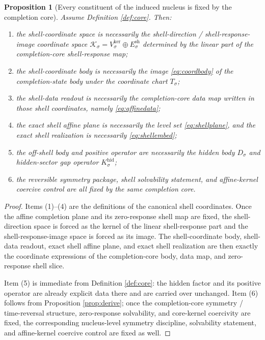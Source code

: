 \documentclass[11pt]{article}
\newcommand{\GapBody}[1]{D_{#1}}
\newcommand{\HiddenOperator}[1]{K_{#1}^{\mathrm{hid}}}
\newcommand{\CoordSpace}[1]{\mathcal K_{#1}}
\newcommand{\ShellNormal}[1]{E_{#1}^{\mathrm{sh}}}
\newcommand{\ShellKer}[1]{V_{#1}^{\mathrm{ker}}}
\newcommand{\CoordIso}[1]{T_{#1}}
\newtheorem{proposition}{Proposition}
\begin{document}
\begin{proposition}[Every constituent of the induced nucleus is fixed by the completion core]
\label{prop:forced}
Assume Definition \ref{def:core}. Then:
\begin{enumerate}
    \item the shell-coordinate space is necessarily the shell-direction / shell-response-image coordinate space \(\CoordSpace{\sigma}=\ShellKer{\sigma}\oplus\ShellNormal{\sigma}\) determined by the linear part of the completion-core shell-response map;
    \item the shell-coordinate body is necessarily the image \eqref{eq:coordbody} of the completion-state body under the coordinate chart \(\CoordIso{\sigma}\);
    \item the shell-data readout is necessarily the completion-core data map written in those shell coordinates, namely \eqref{eq:affinedata};
    \item the exact shell affine plane is necessarily the level set \eqref{eq:shellplane}, and the exact shell realization is necessarily \eqref{eq:shellembed};
    \item the off-shell body and positive operator are necessarily the hidden body \(\GapBody{\sigma}\) and hidden-sector gap operator \(\HiddenOperator{\sigma}\);
    \item the reversible symmetry package, shell solvability statement, and affine-kernel coercive control are all fixed by the same completion core.
\end{enumerate}
\end{proposition}

\begin{proof}
Items (1)--(4) are the definitions of the canonical shell coordinates. Once the affine completion plane and its zero-response shell map are fixed, the shell-direction space is forced as the kernel of the linear shell-response part and the shell-response-image space is forced as its image. The shell-coordinate body, shell-data readout, exact shell affine plane, and exact shell realization are then exactly the coordinate expressions of the completion-core body, data map, and zero-response shell slice.

Item (5) is immediate from Definition \ref{def:core}: the hidden factor and its positive operator are already explicit data there and are carried over unchanged. Item (6) follows from Proposition \ref{prop:derive}; once the completion-core symmetry / time-reversal structure, zero-response solvability, and core-kernel coercivity are fixed, the corresponding nucleus-level symmetry discipline, solvability statement, and affine-kernel coercive control are fixed as well.
\end{proof}
\end{document}

